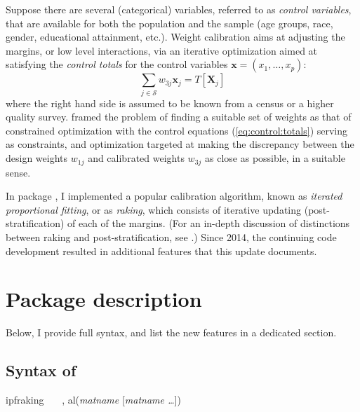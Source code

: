 Suppose there are several (categorical) variables, referred to
as {\it control variables}, that are available for both
the population and the sample
(age groups, race, gender, educational attainment, etc.).
Weight calibration aims at adjusting the margins, or low level interactions,
via an iterative optimization aimed at satisfying
the {\it control totals} for the control variables $\mathbf{x}=(x_1, \ldots, x_p)$:
\begin{equation}
    \sum_{j \in \mathcal{S}} w_{3j} \mathbf{x}_j
    = T [ \mathbf{X}_j  ]
    \label{eq:control:totals}
\end{equation}
where the right hand side is assumed to be known from a census or
a higher quality survey.
\citet{deville:sarndal:1992} framed the problem of finding a suitable
set of weights as that of constrained optimization with the control
equations (\ref{eq:control:totals}) serving as constraints,
and optimization targeted at making the discrepancy between
the design weights $w_{1j}$ and calibrated weights
$w_{3j}$ as close as possible, in a suitable sense.

In package  \citep{kolenikov:2014}, I implemented
a popular calibration algorithm, known as \textit{iterated proportional fitting},
or as \textit{raking}, which consists of iterative updating (post-stratification) of
each of the margins. (For an in-depth discussion of distinctions between
raking and post-stratification, see \citet{kolenikov:2016}.)
Since 2014, the continuing code development resulted
in additional features that this update documents.

\section{Package description}

Below, I provide full syntax, and list the new features in a dedicated section.

\subsection{Syntax of }
\label{subsec:syntax}

\begin{stsyntax}
ipfraking
\optif\
\optin\
\optweight\
,
al({\it matname} [{\it matname \ldots}])
\end{stsyntax}

